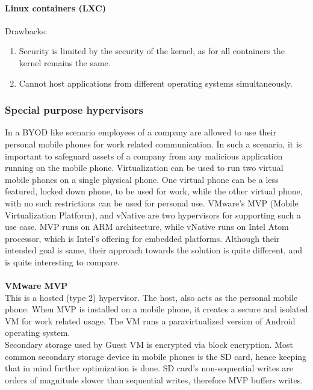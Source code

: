 \documentclass[a4paper,10pt]{article}
\begin{document}
  \paragraph{Linux containers (LXC)}
  Drawbacks:\\
  \begin{enumerate}
   \item Security is limited by the security of the kernel, as for all containers the kernel remains the same.
   \item Cannot host applications from different operating systems simultaneously.
  \end{enumerate}

  \subsubsection{Special purpose hypervisors}
  In a BYOD like scenario employees of a company are allowed to use their personal mobile phones for work related communication. In such a scenario, it is important
  to safeguard assets of a company from any malicious application running on the mobile phone. Virtualization can be used to run two virtual mobile phones
  on a single physical phone. One virtual phone can be a less featured, locked down phone, to be used for work, while the other virtual phone, with no such restrictions
  can be used for personal use. VMware's MVP (Mobile Virtualization Platform)\cite{Barr:2010:VMV:1899928.1899945}, and vNative\cite{7006388} are two hypervisors
  for supporting such a use case. 
  MVP runs on ARM architecture, while vNative runs on Intel Atom processor, which is Intel's offering for embedded platforms.
  Although their intended goal is same, their approach towards the solution is quite different, and is quite interesting to compare.
  \\\\
  \textbf{VMware MVP}
  \\
  This is a hosted (type 2) hypervisor. The host, also acts as the personal mobile phone. When MVP is installed on a mobile phone, it creates a secure and isolated VM for work related usage.
  The VM runs a paravirtualized version of Android operating system.\\
  Secondary storage used by Guest VM is encrypted via block encryption. Most common secondary storage device in mobile phones is the SD card, hence keeping that 
  in mind further optimization is done. SD card's non-sequential writes are orders of magnitude slower than sequential writes, therefore MVP buffers writes.
\end{document}

